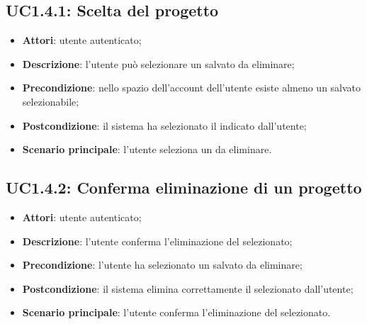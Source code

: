 \subsection{UC1.4.1: Scelta del progetto}
\label{UC1.4.1}
\begin{itemize}
\item \textbf{Attori}: utente autenticato;
\item \textbf{Descrizione}: l’utente può selezionare un  salvato da eliminare;
\item \textbf{Precondizione}: nello spazio dell’account dell’utente esiste almeno un  salvato selezionabile;
\item \textbf{Postcondizione}: il sistema ha selezionato il  indicato dall’utente;
\item \textbf{Scenario principale}:
l’utente seleziona un  da eliminare.
\end{itemize}
\subsection{UC1.4.2: Conferma eliminazione di un progetto}
\label{UC1.4.2}
\begin{itemize}
\item \textbf{Attori}: utente autenticato;
\item \textbf{Descrizione}: l’utente conferma l’eliminazione del  selezionato;
\item \textbf{Precondizione}: l’utente ha selezionato un  salvato da eliminare;
\item \textbf{Postcondizione}: il sistema elimina correttamente il  selezionato dall’utente;
\item \textbf{Scenario principale}:
l’utente conferma l’eliminazione del  selezionato.
\end{itemize}
